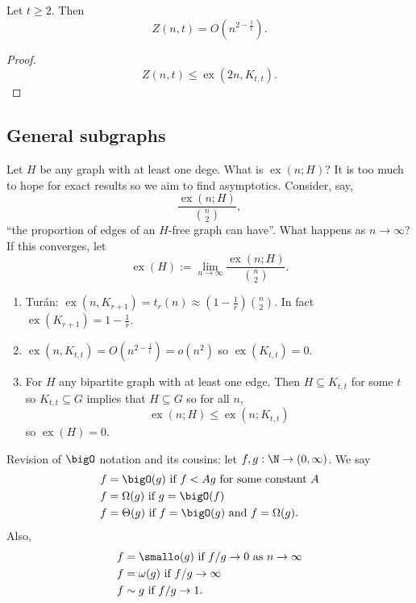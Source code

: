 \documentclass[a4paper]{article}
\newcommand*{\Omg}{\Omega}
\newcommand*{\bigT}{\Theta}
\newcommand*{\smallomg}{\omega}
\DeclareMathOperator{\exx}{ex} %
\begin{document}
\begin{corollary}
  Let \(t \geq 2\). Then
  \[
    Z(n, t) = O(n^{2 - \frac{1}{t}}).
  \]
\end{corollary}

\begin{proof}
  \[
    Z(n, t) \leq \exx(2n, K_{t, t}).
  \]
\end{proof}

\subsection{General subgraphs}

Let \(H\) be any graph with at least one dege. What is \(\exx(n; H)\)? It is too much to hope for exact results so we aim to find asymptotics. Consider, say,
\[
  \frac{\exx(n; H)}{\binom{n}{2}},
\]
``the proportion of edges of an \(H\)-free graph can have''. What happens as \(n \to \infty\)? If this converges, let
\[
  \exx(H) := \lim_{n \to \infty} \frac{\exx(n; H)}{\binom{n}{2}}.
\]

\begin{eg}\leavevmode
  \begin{enumerate}
  \item Turán: \(\exx(n, K_{r + 1}) = t_r(n) \approx (1 - \frac{1}{r}) \binom{n}{2}\). In fact \(\exx(K_{r + 1}) = 1 - \frac{1}{r}\).
  \item \(\exx(n, K_{t, t}) = O(n^{2 - \frac{1}{t}}) = o(n^2)\) so \(\exx(K_{t, t}) = 0\).
  \item For \(H\) any bipartite graph with at least one edge. Then \(H \subseteq K_{t, t}\) for some \(t\) so \(K_{t, t} \subseteq G\) implies that \(H \subseteq G\) so for all \(n\),
    \[
      \exx(n; H) \leq \exx(n; K_{t, t})
    \]
    so \(\exx(H) = 0\).
  \end{enumerate}
\end{eg}









\iffalse

Revision of \(\bigO\) notation and its cousins: let \(f,g:\N\to (0,\infty)\). We say
\begin{align*}
  f &= \bigO(g) \text{ if } f< Ag \text{ for some constant } A \\
  f &= \Omg(g) \text{ if } g=\bigO(f) \\
  f &= \bigT(g) \text{ if } f=\bigO(g) \text{ and } f = \Omg(g).
\end{align*}
Also,
\begin{align*}
  f &= \smallo(g) \text{ if } f/g\to 0 \text{ as } n\to \infty \\
  f &= \smallomg(g) \text{ if } f/g\to \infty \\
  f &\sim g \text{ if } f/g\to 1.
\end{align*}
\end{document}
